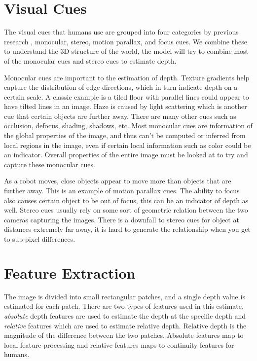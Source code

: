 \documentclass[journal]{IEEEtran}
\begin{document}
\section{Visual Cues}
The visual cues that humans use are grouped into four categories by previous research \cite{loomis01, schwartz99}, monocular, stereo, motion parallax, and focus cues. We combine these to understand the 3D structure of the world, the model will try to combine most of the monocular cues and stereo cues to estimate depth.

Monocular cues are important to the estimation of depth. Texture gradients help capture the distribution of edge directions, which in turn indicate depth on a certain scale. A classic example is a tiled floor with parallel lines could appear to have tilted lines in an image. Haze is caused by light scattering which is another cue that certain objects are further away. There are many other cues such as occlusion, defocus, shading, shadows, etc. Most monocular cues are information of the global properties of the image, and thus can't be computed or inferred from local regions in the image, even if certain local information such as color could be an indicator. Overall properties of the entire image must be looked at to try and capture these monocular cues.

As a robot moves, close objects appear to move more than objects that are further away. This is an example of motion parallax cues. The ability to focus also causes certain object to be out of focus, this can be an indicator of depth as well. Stereo cues usually rely on some sort of geometric relation between the two cameras capturing the images. There is a downfall to stereo cues for object at distances extremely far away, it is hard to generate the relationship when you get to sub-pixel differences.

\section{Feature Extraction}
The image is divided into small rectangular patches, and a single depth value is estimated for each patch. There are two types of features used in this estimate, {\em absolute} depth features are used to estimate the depth at the specific depth and {\em relative} features which are used to estimate relative depth. Relative depth is the magnitude of the difference between the two patches. Absolute features map to local feature processing and relative features maps to continuity features for humans.
\end{document}
